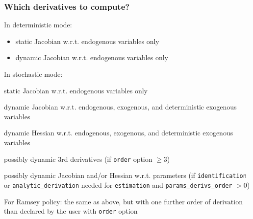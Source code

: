 \documentclass[handout,usepdftitle=false,xcolor=dvipsnames,aspectratio=169]{beamer}
\begin{document}
\begin{frame}
  \frametitle{Which derivatives to compute?}
  \begin{witemize}
  \item In deterministic mode:
    \begin{itemize}
    \item static Jacobian w.r.t. endogenous variables only
    \item dynamic Jacobian w.r.t. endogenous variables only
    \end{itemize}
  \item In stochastic mode:
    \begin{witemize}
    \item static Jacobian w.r.t. endogenous variables only
    \item dynamic Jacobian w.r.t. endogenous, exogenous, and deterministic exogenous variables
    \item dynamic Hessian w.r.t. endogenous, exogenous, and deterministic exogenous variables
    \item possibly dynamic 3rd derivatives (if \texttt{order} option $\geq 3$)
    \item possibly dynamic Jacobian and/or Hessian w.r.t. parameters (if \texttt{identification} or \texttt{analytic\_derivation} needed for \texttt{estimation} and \texttt{params\_derivs\_order} $>0$)
    \end{witemize}
  \item For Ramsey policy: the same as above, but with one further order of derivation than declared by the user with \texttt{order} option
  \end{witemize}
\end{frame}
\end{document}

